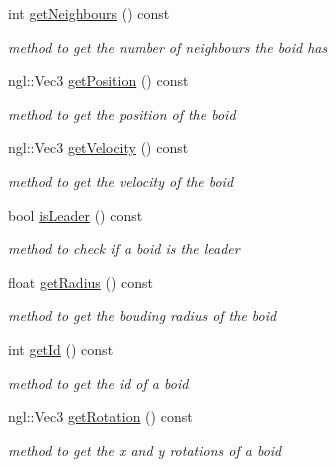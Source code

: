 \begin{DoxyCompactItemize}
int \hyperlink{classBoid_ae4d6cb62f1811008b923e1d1bf349430}{getNeighbours} () const 
\begin{DoxyCompactList}\small\item\em method to get the number of neighbours the boid has \item\end{DoxyCompactList}\item 
ngl::Vec3 \hyperlink{classBoid_a8d92ae43f4b135661bb93afd46c90e94}{getPosition} () const 
\begin{DoxyCompactList}\small\item\em method to get the position of the boid \item\end{DoxyCompactList}\item 
ngl::Vec3 \hyperlink{classBoid_a9b8109fd5bb93268c2591bf0b87a920d}{getVelocity} () const 
\begin{DoxyCompactList}\small\item\em method to get the velocity of the boid \item\end{DoxyCompactList}\item 
bool \hyperlink{classBoid_ae1abb7207513db480e1c84a3f1e95f7a}{isLeader} () const 
\begin{DoxyCompactList}\small\item\em method to check if a boid is the leader \item\end{DoxyCompactList}\item 
float \hyperlink{classBoid_a5ff5c09aa0f501a097116a453013986f}{getRadius} () const 
\begin{DoxyCompactList}\small\item\em method to get the bouding radius of the boid \item\end{DoxyCompactList}\item 
int \hyperlink{classBoid_a579520e335b6033643531218eae95be0}{getId} () const 
\begin{DoxyCompactList}\small\item\em method to get the id of a boid \item\end{DoxyCompactList}\item 
ngl::Vec3 \hyperlink{classBoid_aef5f32444ae2ae6fff812cb8272e437f}{getRotation} () const 
\begin{DoxyCompactList}\small\item\em method to get the x and y rotations of a boid \item\end{DoxyCompactList}\item 

\end{DoxyCompactItemize}
